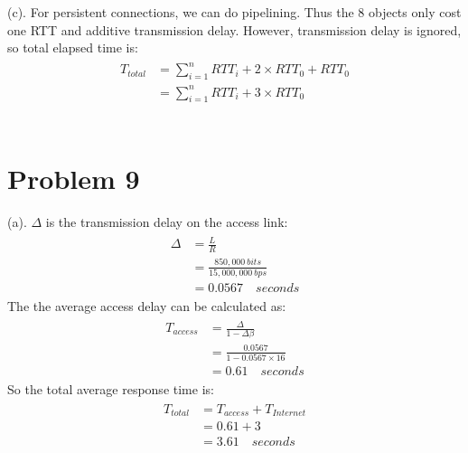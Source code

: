\documentclass[titlepage, paper=a4, fontsize=11pt]{scrartcl} %
\numberwithin{equation}{section} %
\numberwithin{table}{section} %
\begin{document}
(c). For persistent connections, we can do pipelining. Thus the 8 objects only cost one RTT and additive
transmission delay. However, transmission delay is ignored, so total elapsed time is:
\begin{align*} 
\begin{split}
T_{total} &= \sum\limits_{i=1}^n RTT_{i} + 2 \times RTT_{0} + RTT_{0} \\
&= \sum\limits_{i=1}^n RTT_{i} + 3 \times RTT_{0}
\end{split}					
\end{align*}
\\



\section*{Problem 9}
(a). $\Delta$ is the transmission delay on the access link:
\begin{align*} 
\begin{split}
\Delta &= \frac{L}{R} \\
&= \frac{850,000 \  bits}{15,000,000 \  bps} \\
&= 0.0567 \quad seconds
\end{split}					
\end{align*}
The the average access delay can be calculated as:
\begin{align*} 
\begin{split}
T_{access} &= \frac{\Delta}{1-\Delta\beta} \\
&= \frac{0.0567}{1-0.0567 \times 16} \\
&= 0.61 \quad seconds
\end{split}					
\end{align*}
So the total average response time is:
\begin{align*} 
\begin{split}
T_{total} &= T_{access} + T_{Internet} \\
&= 0.61 + 3 \\
&= 3.61 \quad seconds
\end{split}					
\end{align*}
\end{document}
